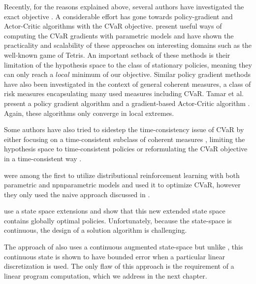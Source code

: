 Recently, for the reasons explained above, several authors have investigated the exact objective . A considerable effort has gone towards policy-gradient \citep{sutton2000policy} and Actor-Critic \citep{konda2000actor} algorithms with the CVaR objective. \citet{tamar2015optimizing, chow2014algorithms} present useful ways of computing the CVaR gradients with parametric models and have shown the practicality and scalability of these approaches on interesting domains such as the well-known game of Tetris. An important setback of these methods is their limitation of the hypothesis space to the class of stationary policies, meaning they can only reach a $local$ minimum of our objective.
Similar policy gradient methods have also been investigated in the context of general coherent measures, a class of risk measures encapsulating many used measures including CVaR. Tamar et al. present a policy gradient algorithm \citep{tamar2017sequential} and a gradient-based Actor-Critic algorithm \citep{tamar2017sequential}. Again, these algorithms only converge in local extremes.

Some authors have also tried to sidestep the time-consistency issue of CVaR by either focusing on a time-consistent subclass of coherent measures \cite{???}, limiting the hypothesis space to time-consistent policies or reformulating the CVaR objective in a time-consistent way \cite{miller2017optimal}.

\citet{morimura2010nonparametric, morimura2012parametric} were among the first to utilize distributional reinforcement learning with both parametric and npnparametric models and used it to optimize CVaR, however they only used the naive approach discussed in .

\citet{bauerle2011markov} use a state space extensions and show that this new extended state space contains globally optimal policies. Unfortunately, because the state-space is continuous, the design of a solution algorithm is challenging.

The approach of \citet{chow2015risk} also uses a continuous augmented state-space but unlike \citet{bauerle2011markov}, this continuous state is shown to have bounded error when a particular linear discretization is used. The only flaw of this approach is the requirement of a linear program computation, which we address in the next chapter.



